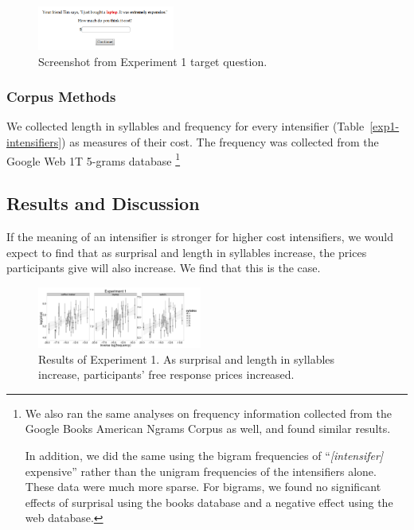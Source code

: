 \documentclass[10pt,letterpaper]{article}
\begin{document}
\begin{figure}[ht]
\begin{center}
\includegraphics[width=0.4\textwidth]{analysis_files_for_writeup/images/exp1-q.png}
\end{center}
\caption{Screenshot from Experiment 1 target question.} 
\label{exp1-q}
\end{figure}

\subsubsection{Corpus Methods}

We collected length in syllables and frequency for every intensifier (Table~\ref{exp1-intensifiers}) as measures of their cost. The frequency was collected from the Google Web 1T 5-grams database \cite{web1t5gram}\footnote{
We also ran the same analyses on frequency information collected from the Google Books American Ngrams Corpus \cite{books2011} as well, and found similar results.

In addition, we did the same using the bigram frequencies of ``\emph{[intensifer]} expensive'' rather than the unigram frequencies of the intensifiers alone. These data were much more sparse. For bigrams, we found no significant effects of surprisal using the books database and a negative effect using the web database.
}

\subsection{Results and Discussion}

If the meaning of an intensifier is stronger for higher cost intensifiers, we would expect to find that as surprisal and length in syllables increase, the prices participants give will also increase. We find that this is the case.

\begin{figure}[ht]
\begin{center}
\includegraphics[width=0.48\textwidth]{analysis_files_for_writeup/images/exp1-plot.png}
\end{center}
\caption{Results of Experiment 1. As surprisal and length in syllables increase, participants' free response prices increased.} 
\label{exp1-plot}
\end{figure}
\end{document}
